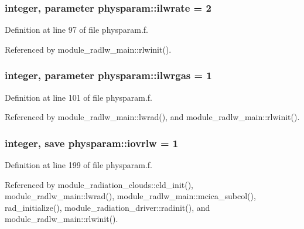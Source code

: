 \subsubsection[{\texorpdfstring{ilwrate}{ilwrate}}]{\setlength{\rightskip}{0pt plus 5cm}integer, parameter physparam\+::ilwrate = 2}\hypertarget{namespacephysparam_a8db5b34f68cb0e3698aa1c200fecd880}{}\label{namespacephysparam_a8db5b34f68cb0e3698aa1c200fecd880}


Definition at line 97 of file physparam.\+f.



Referenced by module\+\_\+radlw\+\_\+main\+::rlwinit().

\subsubsection[{\texorpdfstring{ilwrgas}{ilwrgas}}]{\setlength{\rightskip}{0pt plus 5cm}integer, parameter physparam\+::ilwrgas = 1}\hypertarget{namespacephysparam_a0658ae9417d6c79963e41e7d2a598309}{}\label{namespacephysparam_a0658ae9417d6c79963e41e7d2a598309}


Definition at line 101 of file physparam.\+f.



Referenced by module\+\_\+radlw\+\_\+main\+::lwrad(), and module\+\_\+radlw\+\_\+main\+::rlwinit().

\subsubsection[{\texorpdfstring{iovrlw}{iovrlw}}]{\setlength{\rightskip}{0pt plus 5cm}integer, save physparam\+::iovrlw = 1}\hypertarget{namespacephysparam_a644d850cdfb6dd159e51223f715683f6}{}\label{namespacephysparam_a644d850cdfb6dd159e51223f715683f6}


Definition at line 199 of file physparam.\+f.



Referenced by module\+\_\+radiation\+\_\+clouds\+::cld\+\_\+init(), module\+\_\+radlw\+\_\+main\+::lwrad(), module\+\_\+radlw\+\_\+main\+::mcica\+\_\+subcol(), rad\+\_\+initialize(), module\+\_\+radiation\+\_\+driver\+::radinit(), and module\+\_\+radlw\+\_\+main\+::rlwinit().

